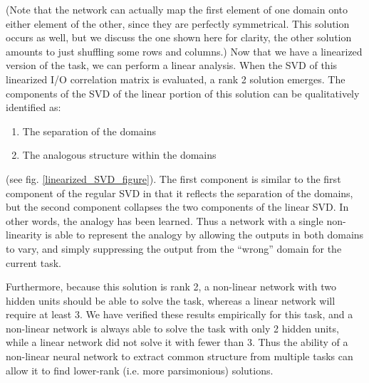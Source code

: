 \documentclass[10pt,letterpaper]{article}
\begin{document}
(Note that the network can actually map the first element of one domain onto either element of the other, since they are perfectly symmetrical. This solution occurs as well, but we discuss the one shown here for clarity, the other solution amounts to just shuffling some rows and columns.) Now that we have a linearized version of the task, we can perform a linear analysis. When the SVD of this linearized I/O correlation matrix is evaluated, a rank 2 solution emerges. The components of the SVD of the linear portion of this solution can be qualitatively identified as: \begin{enumerate}
\itemsep0em
\item The separation of the domains
\item The analogous structure within the domains
\end{enumerate}
(see fig. \ref{linearized_SVD_figure}). The first component is similar to the first component of the regular SVD in that it reflects the separation of the domains, but the second component collapses the two components of the linear SVD. In other words, the analogy has been learned. Thus a network with a single non-linearity is able to represent the analogy by allowing the outputs in both domains to vary, and simply suppressing the output from the ``wrong'' domain for the current task.\par
Furthermore, because this solution is rank 2, a non-linear network with two hidden units should be able to solve the task, whereas a linear network will require at least 3. We have verified these results empirically for this task, and a non-linear network is always able to solve the task with only 2 hidden units, while a linear network did not solve it with fewer than 3. Thus the ability of a non-linear neural network to extract common structure from multiple tasks can allow it to find lower-rank (i.e. more parsimonious) solutions. 
\end{document}
